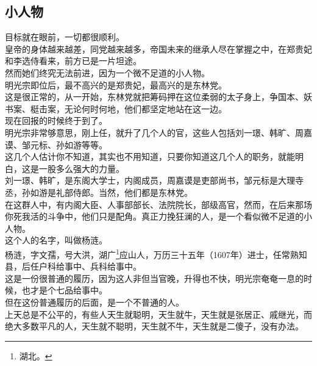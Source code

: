 \begin{multicols}{\theparacolNo}
\subsection{小人物}
目标就在眼前，一切都很顺利。\\

皇帝的身体越来越差，同党越来越多，帝国未来的继承人尽在掌握之中，在郑贵妃和李选侍看来，前方已是一片坦途。\\

然而她们终究无法前进，因为一个微不足道的小人物。\\

明光宗即位后，最不高兴的是郑贵妃，最高兴的是东林党。\\

这是很正常的，从一开始，东林党就把筹码押在这位柔弱的太子身上，争国本、妖书案、梃击案，无论何时何地，他们都坚定地站在这一边。\\

现在回报的时候终于到了。\\

明光宗非常够意思，刚上任，就升了几个人的官，这些人包括刘一璟、韩旷、周嘉谟、邹元标、孙如游等等。\\

这几个人估计你不知道，其实也不用知道，只要你知道这几个人的职务，就能明白，这是一股多么强大的力量。\\

刘一璟、韩旷，是东阁大学士，内阁成员，周嘉谟是吏部尚书，邹元标是大理寺丞，孙如游是礼部侍郎。当然，他们都是东林党。\\

在这群人中，有内阁大臣、人事部部长、法院院长，部级高官，然而，在后来那场你死我活的斗争中，他们只是配角。真正力挽狂澜的人，是一个看似微不足道的小人物。\\

这个人的名字，叫做杨涟。\\

杨涟，字文孺，号大洪，湖广\footnote{湖北。}应山人，万历三十五年（1607年）进士，任常熟知县，后任户科给事中、兵科给事中。\\

这是一份很普通的履历，因为这人非但当官晚，升得也不快，明光宗奄奄一息的时候，也才是个七品给事中。\\

但在这份普通履历的后面，是一个不普通的人。\\

上天总是不公平的，有些人天生就聪明，天生就牛，天生就是张居正、戚继光，而绝大多数平凡的人，天生就不聪明，天生就不牛，天生就是二傻子，没有办法。\\


\end{multicols}
